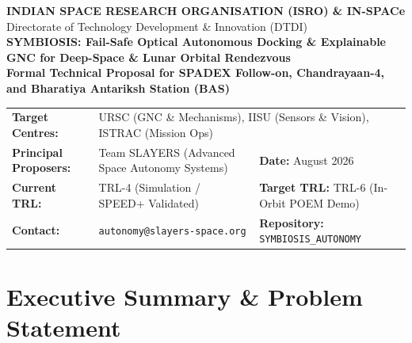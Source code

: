 \documentclass[11pt,a4paper]{article}
\begin{document}
\begin{tcolorbox}[colback=isroblue, coltext=white, boxrule=0pt, arc=4mm]
\begin{center}
    {\large \textbf{INDIAN SPACE RESEARCH ORGANISATION (ISRO) \& IN-SPACe}}\\[1mm]
    {\normalsize Directorate of Technology Development \& Innovation (DTDI)}\\[4mm]
    {\LARGE \textbf{SYMBIOSIS: Fail-Safe Optical Autonomous Docking \& Explainable GNC for Deep-Space \& Lunar Orbital Rendezvous}}\\[3mm]
    {\small \textbf{Formal Technical Proposal for SPADEX Follow-on, Chandrayaan-4, and Bharatiya Antariksh Station (BAS)}}
\end{center}
\end{tcolorbox}

\vspace{2mm}

\noindent
\begin{tabularx}{\textwidth}{@{}llX@{}}
\textbf{Target Centres:} & \multicolumn{2}{l}{URSC (GNC \& Mechanisms), IISU (Sensors \& Vision), ISTRAC (Mission Ops)} \\
\textbf{Principal Proposers:} & Team SLAYERS (Advanced Space Autonomy Systems) & \textbf{Date:} August 2026 \\
\textbf{Current TRL:} & TRL-4 (Simulation / SPEED+ Validated) & \textbf{Target TRL:} TRL-6 (In-Orbit POEM Demo) \\
\textbf{Contact:} & \texttt{autonomy@slayers-space.org} & \textbf{Repository:} \texttt{SYMBIOSIS\_AUTONOMY} \\
\bottomrule
\end{tabularx}

\vspace{4mm}

\section{Executive Summary \& Problem Statement}
\end{document}
